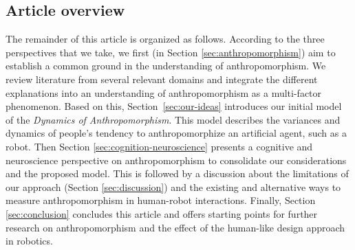 \documentclass{frontiersSCNS} %
\begin{document}
\subsection{Article overview}


The remainder of this article is organized as follows.
According to the three perspectives that we take, 
we first (in Section
\ref{sec:anthropomorphism}) aim to establish a common ground in the
understanding of anthropomorphism. We review literature from several relevant domains and integrate the different explanations into an understanding of
anthropomorphism as a multi-factor phenomenon.
Based on this, Section~\ref{sec:our-ideas} introduces our initial model of the
\textit{Dynamics of Anthropomorphism}. This model describes the variances
and dynamics of people's tendency to anthropomorphize an artificial agent,
such as a robot. 
Then Section \ref{sec:cognition-neuroscience} presents a
cognitive and neuroscience perspective on anthropomorphism to consolidate
our considerations and the proposed model.
This is followed by a discussion
about the limitations of our approach (Section \ref{sec:discussion}) and the
existing and alternative ways to measure anthropomorphism in human-robot
interactions.
Finally, Section \ref{sec:conclusion} concludes this article
and offers starting points for further research on anthropomorphism and the
effect of the human-like design approach in robotics.

\end{document}
